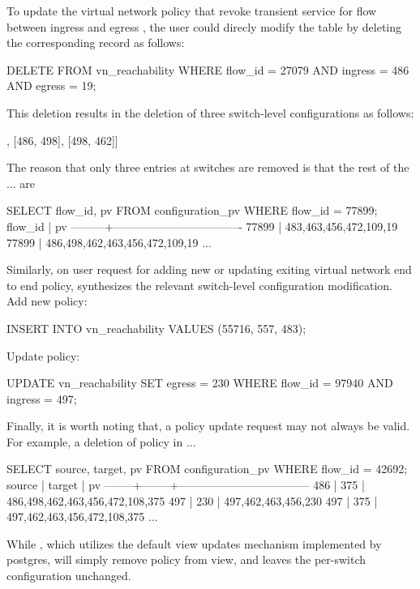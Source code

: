 To update the virtual network policy that revoke transient service for
flow  between ingress  and egress , the user
could direcly modify the  table by deleting the
corresponding record as follows:
\begin{sql}
DELETE FROM vn_reachability WHERE 
        flow_id = 27079 AND ingress = 486 AND egress = 19;  
\end{sql}

This deletion results in the deletion of three switch-level
configurations as follows:
\begin{sql}
[[462, 463], [486, 498], [498, 462]]  
\end{sql}
The reason that only three entries at switches  are
removed is that the rest of the ... are 

\begin{sql}
SELECT flow_id, pv FROM configuration_pv WHERE flow_id = 77899;
 flow_id |                pv                
---------+----------------------------------
   77899 | {483,463,456,472,109,19}
   77899 | {486,498,462,463,456,472,109,19}
   ...
\end{sql}

Similarly, on user request for adding new or updating exiting virtual
network end to end policy, \Sys synthesizes the relevant switch-level
configuration modification.
Add new policy:
\begin{sql}
INSERT INTO vn_reachability VALUES (55716, 557, 483);  
\end{sql}

Update policy:
\begin{sql}
UPDATE vn_reachability SET egress = 230
        WHERE flow_id = 97940 AND ingress = 497;  
\end{sql}

Finally, it is worth noting that, a policy update request may not
always be valid. For example, a deletion of policy  in ... 

\begin{sql}
SELECT source, target, pv FROM configuration_pv WHERE flow_id = 42692;
 source | target |                pv                 
--------+--------+-----------------------------------
    486 |    375 | {486,498,462,463,456,472,108,375}
    497 |    230 | {497,462,463,456,230}
    497 |    375 | {497,462,463,456,472,108,375}
    ...
\end{sql}

While \Sys, which utilizes the default view updates mechanism
implemented by postgres, will simply remove policy  from  view, and leaves the per-switch
configuration unchanged. 

